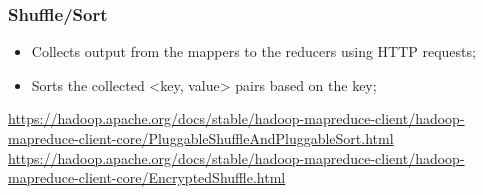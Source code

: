 \documentclass[aspectratio=169]{beamer}
\begin{document}
\begin{frame}
	\frametitle{Shuffle/Sort}

	\begin{itemize}
		\item Collects output from the mappers to the reducers using HTTP requests;
		\item Sorts the collected <key, value> pairs based on the key;
	\end{itemize}

	\begin{center}
		{\tiny \href{https://hadoop.apache.org/docs/stable/hadoop-mapreduce-client/hadoop-mapreduce-client-core/PluggableShuffleAndPluggableSort.html}{https://hadoop.apache.org/docs/stable/hadoop-mapreduce-client/hadoop-mapreduce-client-core/PluggableShuffleAndPluggableSort.html}}
		{\tiny \href{https://hadoop.apache.org/docs/stable/hadoop-mapreduce-client/hadoop-mapreduce-client-core/EncryptedShuffle.html}{https://hadoop.apache.org/docs/stable/hadoop-mapreduce-client/hadoop-mapreduce-client-core/EncryptedShuffle.html}}
	\end{center}
\end{frame}
\end{document}
